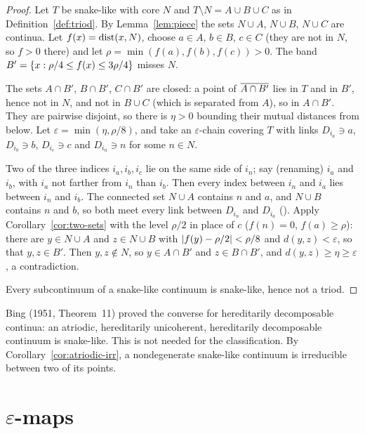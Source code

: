 \begin{proof}
Let $T$ be snake-like with core $N$ and $T\setminus N=A\cup B\cup C$ as in Definition~\ref{def:triod}.
By Lemma~\ref{lem:piece} the sets $N\cup A$, $N\cup B$, $N\cup C$ are continua. Let
$f(x)=\operatorname{dist}(x,N)$, choose $a\in A$, $b\in B$, $c\in C$ (they are not in $N$, so $f>0$ there) and let
$\rho=\min(f(a),f(b),f(c))>0$. The band $B'=\left\{ x:\rho/4\le f(x)\le3\rho/4 \right\}$ misses $N$.

The sets $A\cap B'$, $B\cap B'$, $C\cap B'$ are closed: a point of $\overline{A\cap B'}$ lies in $T$ and in
$B'$, hence not in $N$, and not in $B\cup C$ (which is separated from $A$), so in $A\cap B'$. They are
pairwise disjoint, so there is $\eta>0$ bounding their mutual distances from below. Let
$\varepsilon=\min(\eta,\rho/8)$, and take an $\varepsilon$-chain covering $T$ with links $D_{i_a}\ni a$,
$D_{i_b}\ni b$, $D_{i_c}\ni c$ and $D_{i_n}\ni n$ for some $n\in N$.

Two of the three indices $i_a,i_b,i_c$ lie on the same side of $i_n$; say (renaming) $i_a$ and $i_b$,
with $i_a$ not farther from $i_n$ than $i_b$. Then every index between $i_n$ and $i_a$ lies between
$i_n$ and $i_b$. The connected set $N\cup A$ contains $n$ and $a$, and $N\cup B$ contains $n$ and $b$,
so both meet every link between $D_{i_n}$ and $D_{i_a}$ (). Apply
Corollary~\ref{cor:two-sets} with the level $\rho/2$ in place of $c$ ($f(n)=0$, $f(a)\ge\rho$): there are $y\in N\cup A$ and
$z\in N\cup B$ with $\left\lvert f(y)-\rho/2\right\rvert<\rho/8$ and $d(y,z)<\varepsilon$, so that $y,z\in B'$. Then
$y,z\notin N$, so $y\in A\cap B'$ and $z\in B\cap B'$, and $d(y,z)\ge\eta\ge\varepsilon$, a contradiction.

Every subcontinuum of a snake-like continuum is snake-like, hence not a triod.
\end{proof}


\begin{remark}
Bing (1951, Theorem~11) proved the converse for hereditarily decomposable continua: an atriodic,
hereditarily unicoherent, hereditarily decomposable continuum is snake-like. This is not needed
for the classification. By Corollary~\ref{cor:atriodic-irr}, a nondegenerate snake-like continuum
is irreducible between two of its points.
\end{remark}

\section{\texorpdfstring{$\varepsilon$}{Epsilon}-maps}

